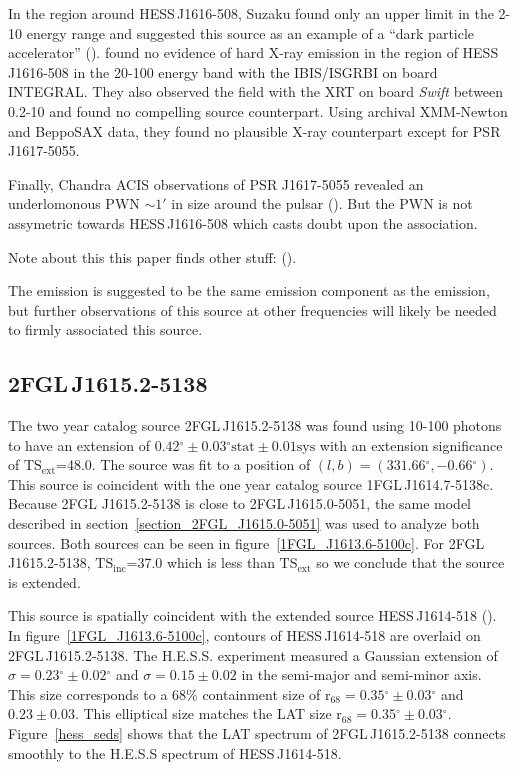 \documentclass[12pt,preprint]{aastex}
\newcommand{\kev}{\text{Kev}\xspace}
\newcommand{\gev}{\text{GeV}\xspace}
\newcommand{\tev}{\text{TeV}\xspace}
\newcommand{\tsext}{{\ensuremath{\text{TS}_{\text{ext}}}}\xspace}
\newcommand{\tsinc}{\ensuremath{\text{TS}_{\text{inc}}}\xspace}
\newcommand{\rsixeight}{{\ensuremath{\text{r}_{68}}}\xspace}
\newcommand{\sys}{\text{sys}\xspace}
\newcommand{\stat}{\text{stat}\xspace}
\renewcommand{\deg}{\ensuremath{^\circ}\xspace}
\renewcommand{\approx}{\sim\!\xspace}
\begin{document}
In the region around HESS\,J1616-508, Suzaku found only an upper limit
in the 2-10 \kev energy range and suggested this source as an example
of a ``dark particle accelerator'' (\cite{suzakzu_HESS_J1616-508}).
\cite{integral_HESS_J1616-508} found no evidence of hard X-ray emission
in the region of HESS\,J1616-508 in the 20-100 \kev energy band with the
IBIS/ISGRBI on board INTEGRAL. They also observed the field with the XRT
on board {\em Swift} between 0.2-10 \kev and found no compelling source
counterpart. Using archival XMM-Newton and BeppoSAX data, they found no
plausible X-ray counterpart except for PSR J1617-5055.

Finally, Chandra ACIS observations of PSR J1617-5055 revealed
an underlomonous PWN $\approx1'$ in size around the pulsar
(\cite{discovery_of_pwn_for_PSR_J1617-5055}). But the PWN is not
assymetric towards HESS\,J1616-508 which casts doubt upon the association.


Note about this this paper finds other stuff: (\cite{discovery_of_pwn_for_PSR_J1617-5055}).


The \gev emission is suggested to be the same emission component as
the \tev emission, but further observations of this source at other
frequencies will likely be needed to firmly associated this source.


\subsection{2FGL\,J1615.2-5138}
\label{section_2FGL_J1615.2-5138}

The two year catalog source 2FGL\,J1615.2-5138 was found 
using 10-100 \gev photons to have
an extension of $0.42\deg\pm0.03\deg\stat\pm0.01\sys$ 
with an extension
significance of \tsext=48.0.  The source was fit to a position
of $(l,b)=(331.66\deg,-0.66\deg)$.  This source is coincident
with the one year catalog source 1FGL\,J1614.7-5138c.  Because 2FGL
J1615.2-5138 is close to 2FGL\,J1615.0-5051, the same model described
in section~\ref{section_2FGL_J1615.0-5051} was used to analyze both
sources. Both sources can be seen in figure~\ref{1FGL_J1613.6-5100c}.
For 2FGL\,J1615.2-5138, \tsinc=37.0 which is less than \tsext so we
conclude that the source is extended.

This source is spatially coincident with the extended
\tev source HESS\,J1614-518 (\cite{hess_plane_survey}). In
figure~\ref{1FGL_J1613.6-5100c}, contours of HESS\,J1614-518 are overlaid
on 2FGL\,J1615.2-5138.  The H.E.S.S. experiment measured a Gaussian
extension of $\sigma=0.23\deg\pm0.02\deg$ and $\sigma=0.15\pm0.02$ in
the semi-major and semi-minor axis. This size corresponds to a 68\%
containment size of $\rsixeight=0.35\deg\pm0.03\deg$ and $0.23\pm0.03$.
This elliptical size matches the LAT size $\rsixeight=0.35\deg\pm0.03\deg$.
Figure~\ref{hess_seds} shows that the LAT spectrum of 2FGL\,J1615.2-5138
connects smoothly to the H.E.S.S spectrum of HESS\,J1614-518.
\end{document}
